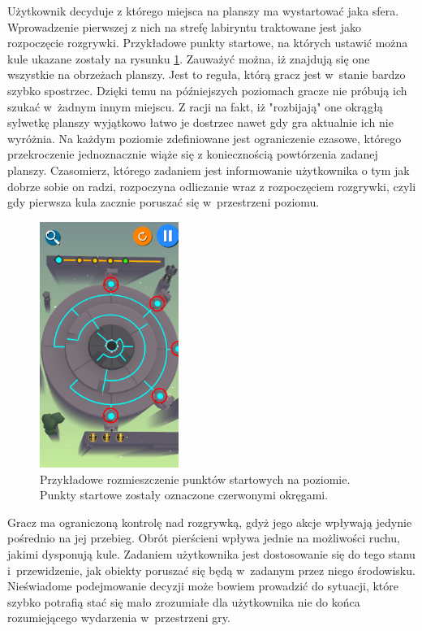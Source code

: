 \documentclass[a4paper,12pt,numbers=noenddot]{report}
\begin{document}
Użytkownik decyduje z którego miejsca na planszy ma wystartować jaka sfera. Wprowadzenie pierwszej z nich na strefę labiryntu traktowane jest jako rozpoczęcie rozgrywki. Przykładowe punkty startowe, na których ustawić można kule ukazane zostały na rysunku \ref{fig:sphaze_startpoints_1}. Zauważyć można, iż znajdują się one wszystkie na obrzeżach planszy. Jest to reguła, którą gracz jest w~stanie bardzo szybko spostrzec. Dzięki temu na późniejszych poziomach gracze nie próbują ich szukać w~żadnym innym miejscu. Z racji na fakt, iż "rozbijają" one okrągłą sylwetkę planszy wyjątkowo łatwo je dostrzec nawet gdy gra aktualnie ich nie wyróżnia. 
Na każdym poziomie zdefiniowane jest ograniczenie czasowe, którego przekroczenie jednoznacznie wiąże się z koniecznością powtórzenia zadanej planszy. Czasomierz, którego zadaniem jest informowanie użytkownika o tym jak dobrze sobie on radzi, rozpoczyna odliczanie wraz z rozpoczęciem rozgrywki, czyli gdy pierwsza kula zacznie poruszać się w~przestrzeni poziomu. 

\begin{figure}[h!]
	\centering
  	\includegraphics[height=8cm]{fig/start_points.jpg}
	\caption{Przykładowe rozmieszczenie punktów startowych na poziomie. Punkty startowe zostały oznaczone czerwonymi okręgami.}
	\label{fig:sphaze_startpoints_1}
\end{figure}

Gracz ma ograniczoną kontrolę nad rozgrywką, gdyż jego akcje wpływają jedynie pośrednio na jej przebieg. Obrót pierścieni wpływa jednie na możliwości ruchu, jakimi dysponują kule. Zadaniem użytkownika jest dostosowanie się do tego stanu i~przewidzenie, jak obiekty poruszać się będą w~zadanym przez niego środowisku. Nieświadome podejmowanie decyzji może bowiem prowadzić do sytuacji, które szybko potrafią stać się mało zrozumiałe dla użytkownika nie do końca rozumiejącego wydarzenia w~przestrzeni gry.
\end{document}
